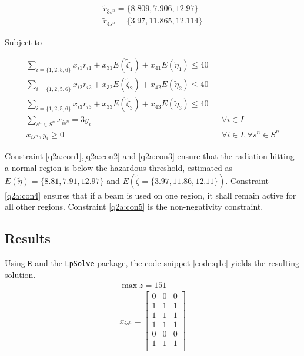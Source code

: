\documentclass[a4paper,11pt]{article}
\begin{document}
\begin{align}
	\tilde{r}_{3s^n} = \{8.809,7.906,12.97\} \\
	\tilde{r}_{4s^n} = \{3.97,11.865,12.114 \} 
\end{align}


Subject to

\begin{align}
\label{q2b:con1}
	\sum_{i =\{1,2,5,6\}}x_{i1}r_{i1} +x_{31}E(\tilde{\zeta}_1)+ x_{41}E(\tilde{\eta}_1)\leq 40 && \\
\label{q2b:con2}
	\sum_{i =\{1,2,5,6\}}x_{i2}r_{i2} +x_{32}E(\tilde{\zeta}_2)+ x_{42}E(\tilde{\eta}_2)\leq 40 && \\
\label{q2b:con3}
	\sum_{i =\{1,2,5,6\}}x_{i3}r_{i3} +x_{33}E(\tilde{\zeta}_3)+ x_{43}E(\tilde{\eta}_3)\leq 40 && \\
\label{q2b:con4}
	\sum_{s^n \in S^n}x_{is^n}=3y_i &&  \forall i \in I \\
\label{q2b:con5}
	 x_{is^n},y_i \geq 0 && \forall i \in I, \forall s^n \in S^n
\end{align}

Constraint \ref{q2a:con1},\ref{q2a:con2} and \ref{q2a:con3} ensure that the radiation hitting a normal region is below the hazardous threshold, estimated as $E(\tilde{\eta})=\{8.81,  7.91, 12.97\}$ and $E(\tilde{\zeta}=\{3.97, 11.86, 12.11\})$. Constraint \ref{q2a:con4} ensures that if a beam is used on one region, it shall remain active for all other regions. Constraint \ref{q2a:con5} is the non-negativity constraint.

\subsection{Results}

Using \texttt{R} and the \texttt{LpSolve} package, the code snippet \ref{code:q1c} yields the resulting solution.
\begin{align}
\max z = 151 \\
x_{is^n}=
	\begin{bmatrix}
    0   & 0  &  0 \\
    1   & 1  &  1 \\
    1   & 1 &   1 \\
    1   & 1 &   1 \\
    0   & 0   & 0 \\ 
    1  &  1  &  1 \\
\end{bmatrix}
\end{align}
\end{document}

